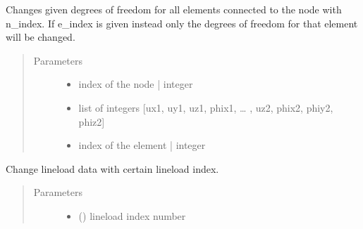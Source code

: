 \documentclass[letterpaper,10pt,english]{sphinxmanual}
\begin{document}
\begin{fulllineitems}
\begin{fulllineitems}
\label{\detokenize{api:beamon.database.Database.change_edof}}
Changes given degrees of freedom for all elements connected to the node with n\_index.
If e\_index is given instead only the degrees of freedom for that element will be changed.
\begin{quote}\begin{description}
\item[{Parameters}] \leavevmode\begin{itemize}
\item {} 
 \textendash{} index of the node | integer

\item {} 
 \textendash{} list of integers {[}ux1, uy1, uz1, phix1, … , uz2, phix2, phiy2, phiz2{]}

\item {} 
 \textendash{} index of the element | integer

\end{itemize}

\end{description}\end{quote}

\end{fulllineitems}


\begin{fulllineitems}
\label{\detokenize{api:beamon.database.Database.change_lineload}}
Change lineload data with certain lineload index.
\begin{quote}\begin{description}
\item[{Parameters}] \leavevmode\begin{itemize}
\item {} 
 () \textendash{} lineload index number


\end{itemize}
\end{description}
\end{quote}
\end{fulllineitems}
\end{fulllineitems}
\end{document}
